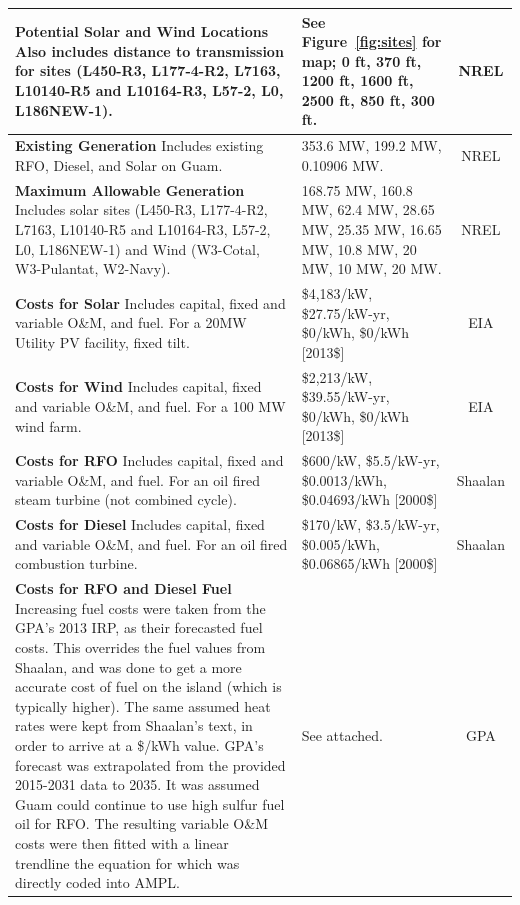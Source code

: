 \documentclass[12pt,letterpaper,fleqn]{article}
\begin{document}
\begin{center}
\begin{longtable}{| p{11cm} | p{3cm} | c | }
    \textbf{Potential Solar and Wind Locations} Also includes distance
    to transmission for sites (L450-R3, L177-4-R2, L7163, L10140-R5
    and L10164-R3, L57-2, L0, L186NEW-1). & See Figure~\ref{fig:sites}
    for map; 0 ft, 370 ft, 1200 ft, 1600 ft, 2500 ft, 850 ft, 300 ft. &
    NREL \cite{misty} \\\hline

    \textbf{Existing Generation} Includes existing RFO, Diesel, and
    Solar on Guam. & 353.6 MW, 199.2 MW, 0.10906 MW. & NREL
    \cite{misty} \\\hline

    \textbf{Maximum Allowable Generation} Includes solar sites
    (L450-R3, L177-4-R2, L7163, L10140-R5 and L10164-R3, L57-2, L0,
    L186NEW-1) and Wind (W3-Cotal, W3-Pulantat, W2-Navy). & 168.75 MW,
    160.8 MW, 62.4 MW, 28.65 MW, 25.35 MW, 16.65 MW, 10.8 MW, 20 MW,
    10 MW, 20 MW. & NREL \cite{misty} \\\hline

    \textbf{Costs for Solar} Includes capital, fixed and variable
    O\&M, and fuel. For a 20MW Utility PV facility, fixed tilt. &
    \$4,183/kW, \$27.75/kW-yr, \$0/kWh, \$0/kWh [2013\$] & EIA
    \cite{eia13} \\\hline

    \textbf{Costs for Wind} Includes capital, fixed and variable O\&M,
    and fuel. For a 100 MW wind farm. & \$2,213/kW, \$39.55/kW-yr,
    \$0/kWh, \$0/kWh [2013\$] & EIA \cite{eia13} \\\hline

    \textbf{Costs for RFO} Includes capital, fixed and variable O\&M,
    and fuel. For an oil fired steam turbine (not combined cycle). &
    \$600/kW, \$5.5/kW-yr, \$0.0013/kWh, \$0.04693/kWh [2000\$] &
    Shaalan \cite{shaalan01} \\\hline

    \textbf{Costs for Diesel} Includes capital, fixed and variable
    O\&M, and fuel. For an oil fired combustion turbine. & \$170/kW,
    \$3.5/kW-yr, \$0.005/kWh, \$0.06865/kWh [2000\$] & Shaalan
    \cite{shaalan01} \\\hline

    \textbf{Costs for RFO and Diesel Fuel} Increasing fuel costs were
    taken from the GPA's 2013 IRP, as their forecasted fuel
    costs. This overrides the fuel values from Shaalan, and was done
    to get a more accurate cost of fuel on the island (which is
    typically higher). The same assumed heat rates were kept from
    Shaalan's text, in order to arrive at a \$/kWh value. GPA's
    forecast was extrapolated from the provided 2015-2031 data to
    2035. It was assumed Guam could continue to use high sulfur fuel
    oil for RFO. The resulting variable O\&M costs were then fitted
    with a linear trendline the equation for which was directly coded
    into AMPL. & See attached. & GPA \cite{cruz13} \\\hline


\end{longtable}
\end{center}
\end{document}
